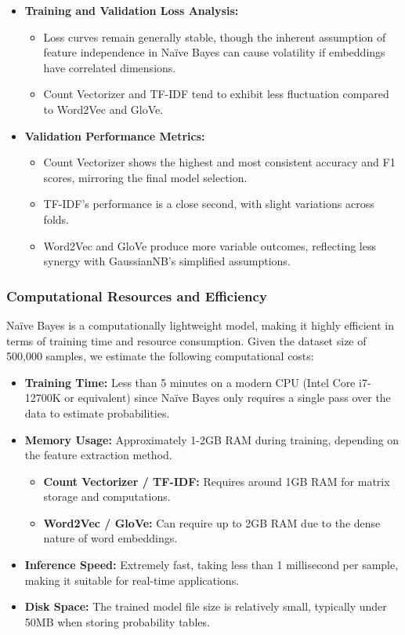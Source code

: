 \begin{itemize}
    \item \textbf{Training and Validation Loss Analysis:}
    \begin{itemize}
        \item Loss curves remain generally stable, though the inherent assumption of feature independence in Naïve Bayes can cause volatility if embeddings have correlated dimensions.
        \item Count Vectorizer and TF-IDF tend to exhibit less fluctuation compared to Word2Vec and GloVe.
    \end{itemize}
    
    \item \textbf{Validation Performance Metrics:}
    \begin{itemize}
        \item Count Vectorizer shows the highest and most consistent accuracy and F1 scores, mirroring the final model selection.
        \item TF-IDF’s performance is a close second, with slight variations across folds.
        \item Word2Vec and GloVe produce more variable outcomes, reflecting less synergy with GaussianNB’s simplified assumptions.
    \end{itemize}
\end{itemize}

\subsubsection{Computational Resources and Efficiency}

Naïve Bayes is a computationally lightweight model, making it highly efficient in terms of training time and resource consumption. Given the dataset size of 500,000 samples, we estimate the following computational costs:

\begin{itemize}
    \item \textbf{Training Time:} Less than 5 minutes on a modern CPU (Intel Core i7-12700K or equivalent) since Naïve Bayes only requires a single pass over the data to estimate probabilities.
    \item \textbf{Memory Usage:} Approximately 1-2GB RAM during training, depending on the feature extraction method.
    \begin{itemize}
        \item \textbf{Count Vectorizer / TF-IDF:} Requires around 1GB RAM for matrix storage and computations.
        \item \textbf{Word2Vec / GloVe:} Can require up to 2GB RAM due to the dense nature of word embeddings.
    \end{itemize}
    \item \textbf{Inference Speed:} Extremely fast, taking less than 1 millisecond per sample, making it suitable for real-time applications.
    \item \textbf{Disk Space:} The trained model file size is relatively small, typically under 50MB when storing probability tables.
\end{itemize}

